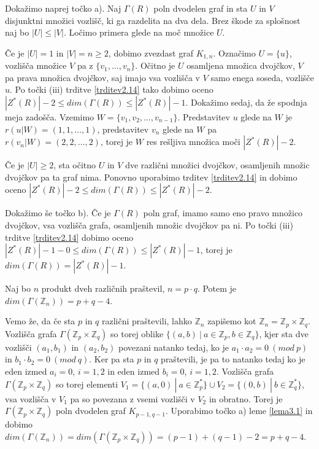 \documentclass[mat1, tisk]{fmfdelo}
\newcommand{\Z}{\mathbb Z}
\begin{document}
\begin{dokaz}
  Dokažimo naprej točko a).
  Naj $\Gamma(R)$ poln dvodelen graf in sta $U$ in $V$ disjunktni množici vozlišč, ki ga razdelita na 
  dva dela. Brez škode za splošnost naj bo $|U| \leq |V|$. Ločimo primera glede na moč množice $U$.

  Če je $|U| = 1$ in $|V| = n \geq 2$, dobimo zvezdast graf $K_{1,n}$. Označimo $U = \{u\}$, vozlišča množice 
  $V$ pa z $\{v_1, \ldots, v_n\}$. Očitno je $U$ osamljena množica dvojčkov, $V$ pa prava množica dvojčkov, 
  saj imajo vsa vozlišča v $V$ samo enega soseda, vozlišče $u$. Po točki (iii) trditve \ref{trditev2.14} tako 
  dobimo oceno $|Z^*(R)| - 2 \leq dim(\Gamma(R)) \leq |Z^*(R)| - 1$. Dokažimo sedaj, da že spodnja meja   
  zadošča. Vzemimo $W = \{v_1, v_2, \ldots, v_{n-1}\}$. Predstavitev $u$ glede na $W$ je 
  $r(u|W)=( 1, 1, \ldots, 1 )$, predstavitev $v_n$ glede na $W$ pa $r(v_n|W)=( 2, 2, \ldots, 2 )$, torej 
  je $W$ res rešljiva množica moči $|Z^*(R)| - 2$.

  Če je $|U| \geq 2$, sta očitno $U$ in $V$ dve različni množici dvojčkov, osamljenih množic dvojčkov 
  pa ta graf nima. Ponovno uporabimo trditev \ref{trditev2.14} in dobimo oceno 
  $|Z^*(R)| - 2 \leq dim(\Gamma(R)) \leq |Z^*(R)| - 2$.

  Dokažimo še točko b). Če je $\Gamma(R)$ poln graf, imamo samo eno pravo množico dvojčkov, vsa vozlišča grafa, 
  osamljenih množic dvojčkov pa ni. Po točki (iii) trditve \ref{trditev2.14} dobimo oceno 
  $|Z^*(R)| - 1 - 0 \leq dim(\Gamma(R)) \leq |Z^*(R)| - 1$, torej je $dim(\Gamma(R)) = |Z^*(R)| - 1$.
\end{dokaz}
%
\begin{trditev}
  Naj bo $n$ produkt dveh različnih praštevil, $n = p \cdot q$. Potem je 
  $dim(\Gamma(\Z_{n})) = p + q - 4$.
\end{trditev}
\begin{dokaz}
  Vemo že, da če sta $p$ in $q$ različni praštevili, lahko $\Z_{n}$ zapišemo kot 
  $\Z_{n} = \Z_{p} \times \Z_{q}$. Vozlišča grafa $\Gamma(\Z_{p} \times \Z_{q})$ so 
  torej oblike $ \{(a,b)~|~a \in \Z_{p}, b \in \Z_{q}\}$, kjer sta dve vozlišči $(a_1, b_1)$ in 
  $(a_2, b_2)$ povezani natanko tedaj, ko je $a_1 \cdot a_2 = 0~(mod~p)$ in $b_1 \cdot b_2 = 0~(mod~q)$. 
  Ker pa sta $p$ in $q$ praštevili, je pa to natanko tedaj ko je eden izmed $a_i = 0$, $i = 1,2$ 
  in eden izmed $b_i = 0$, $i = 1,2$. Vozlišča grafa $\Gamma(\Z_{p} \times \Z_{q})$ so torej 
  elementi $V_1 = \{ (a,0)~|~a \in \Z_{p}^*\} \cup V_2 = \{ (0,b)~|~b \in \Z_{q}^*\}$, vsa 
  vozlišča v $V_1$ pa so povezana z vsemi vozlišči v $V_2$ in obratno. 
  Torej je $\Gamma(\Z_{p} \times \Z_{q})$ poln dvodelen graf $K_{p-1, q-1}$. Uporabimo točko a)
  leme \ref{lema3.1} in dobimo $dim(\Gamma(\Z_{n})) = dim(\Gamma(\Z_{p} \times \Z_{q})) = (p - 1) + (q - 1) - 2 = p + q - 4$.
\end{dokaz}
\end{document}
